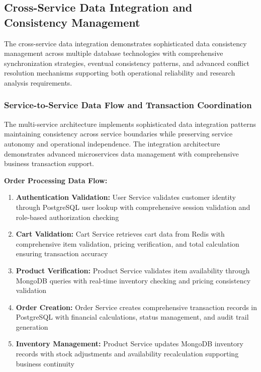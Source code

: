 \subsection{Cross-Service Data Integration and Consistency Management}

The cross-service data integration demonstrates sophisticated data consistency management across multiple database technologies with comprehensive synchronization strategies, eventual consistency patterns, and advanced conflict resolution mechanisms supporting both operational reliability and research analysis requirements.

\subsubsection{Service-to-Service Data Flow and Transaction Coordination}

The multi-service architecture implements sophisticated data integration patterns maintaining consistency across service boundaries while preserving service autonomy and operational independence. The integration architecture demonstrates advanced microservices data management with comprehensive business transaction support.

\textbf{Order Processing Data Flow:}
\begin{enumerate}
\item \textbf{Authentication Validation:} User Service validates customer identity through PostgreSQL user lookup with comprehensive session validation and role-based authorization checking
\item \textbf{Cart Validation:} Cart Service retrieves cart data from Redis with comprehensive item validation, pricing verification, and total calculation ensuring transaction accuracy
\item \textbf{Product Verification:} Product Service validates item availability through MongoDB queries with real-time inventory checking and pricing consistency validation
\item \textbf{Order Creation:} Order Service creates comprehensive transaction records in PostgreSQL with financial calculations, status management, and audit trail generation
\item \textbf{Inventory Management:} Product Service updates MongoDB inventory records with stock adjustments and availability recalculation supporting business continuity
\end{enumerate}

